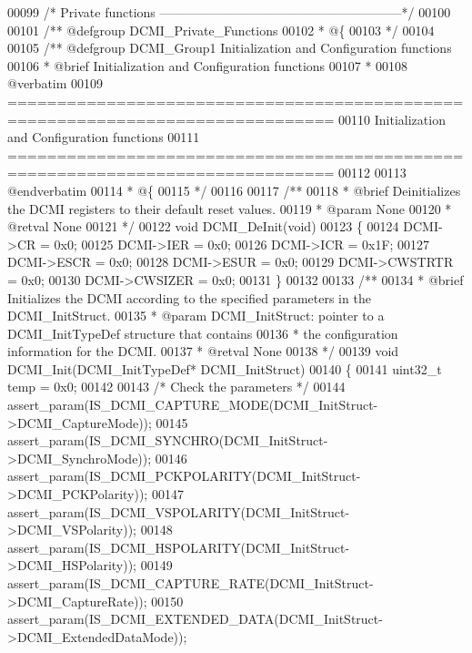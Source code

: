 \begin{DoxyCode}
00099 \textcolor{comment}{/* Private functions ---------------------------------------------------------*/}
00100 
00101 \textcolor{comment}{/** @defgroup DCMI\_Private\_Functions}
00102 \textcolor{comment}{  * @\{}
00103 \textcolor{comment}{  */}
00104 
00105 \textcolor{comment}{/** @defgroup DCMI\_Group1 Initialization and Configuration functions}
00106 \textcolor{comment}{ *  @brief   Initialization and Configuration functions }
00107 \textcolor{comment}{ *}
00108 \textcolor{comment}{@verbatim   }
00109 \textcolor{comment}{ ===============================================================================}
00110 \textcolor{comment}{                  Initialization and Configuration functions}
00111 \textcolor{comment}{ ===============================================================================  }
00112 \textcolor{comment}{}
00113 \textcolor{comment}{@endverbatim}
00114 \textcolor{comment}{  * @\{}
00115 \textcolor{comment}{  */}
00116 
00117 \textcolor{comment}{/**}
00118 \textcolor{comment}{  * @brief  Deinitializes the DCMI registers to their default reset values.}
00119 \textcolor{comment}{  * @param  None}
00120 \textcolor{comment}{  * @retval None}
00121 \textcolor{comment}{  */}
00122 \textcolor{keywordtype}{void} DCMI_DeInit(\textcolor{keywordtype}{void})
00123 \{
00124   DCMI->CR = 0x0;
00125   DCMI->IER = 0x0;
00126   DCMI->ICR = 0x1F;
00127   DCMI->ESCR = 0x0;
00128   DCMI->ESUR = 0x0;
00129   DCMI->CWSTRTR = 0x0;
00130   DCMI->CWSIZER = 0x0;
00131 \}
00132 
00133 \textcolor{comment}{/**}
00134 \textcolor{comment}{  * @brief  Initializes the DCMI according to the specified parameters in the DCMI\_InitStruct.}
00135 \textcolor{comment}{  * @param  DCMI\_InitStruct: pointer to a DCMI\_InitTypeDef structure that contains }
00136 \textcolor{comment}{  *         the configuration information for the DCMI.}
00137 \textcolor{comment}{  * @retval None}
00138 \textcolor{comment}{  */}
00139 \textcolor{keywordtype}{void} DCMI_Init(DCMI\_InitTypeDef* DCMI\_InitStruct)
00140 \{
00141   uint32\_t temp = 0x0;
00142 
00143   \textcolor{comment}{/* Check the parameters */}
00144   assert_param(IS\_DCMI\_CAPTURE\_MODE(DCMI\_InitStruct->DCMI\_CaptureMode));
00145   assert_param(IS\_DCMI\_SYNCHRO(DCMI\_InitStruct->DCMI\_SynchroMode));
00146   assert_param(IS\_DCMI\_PCKPOLARITY(DCMI\_InitStruct->DCMI\_PCKPolarity));
00147   assert_param(IS\_DCMI\_VSPOLARITY(DCMI\_InitStruct->DCMI\_VSPolarity));
00148   assert_param(IS\_DCMI\_HSPOLARITY(DCMI\_InitStruct->DCMI\_HSPolarity));
00149   assert_param(IS\_DCMI\_CAPTURE\_RATE(DCMI\_InitStruct->DCMI\_CaptureRate));
00150   assert_param(IS\_DCMI\_EXTENDED\_DATA(DCMI\_InitStruct->DCMI\_ExtendedDataMode));

\end{DoxyCode}
